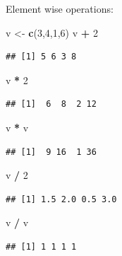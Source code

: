 \documentclass[]{book}
\newenvironment{Shaded}{\begin{snugshade}}{\end{snugshade}}
\newcommand{\DecValTok}[1]{\textcolor[rgb]{0.00,0.00,0.81}{#1}}
\newcommand{\KeywordTok}[1]{\textcolor[rgb]{0.13,0.29,0.53}{\textbf{#1}}}
\newcommand{\NormalTok}[1]{#1}
\newcommand{\OperatorTok}[1]{\textcolor[rgb]{0.81,0.36,0.00}{\textbf{#1}}}
\newcommand{\StringTok}[1]{\textcolor[rgb]{0.31,0.60,0.02}{#1}}
\begin{document}
Element wise operations:

\begin{Shaded}
\begin{Highlighting}[]
\NormalTok{v <-}\StringTok{ }\KeywordTok{c}\NormalTok{(}\DecValTok{3}\NormalTok{,}\DecValTok{4}\NormalTok{,}\DecValTok{1}\NormalTok{,}\DecValTok{6}\NormalTok{)}
\NormalTok{v }\OperatorTok{+}\StringTok{ }\DecValTok{2}
\end{Highlighting}
\end{Shaded}

\begin{verbatim}
## [1] 5 6 3 8
\end{verbatim}

\begin{Shaded}
\begin{Highlighting}[]
\NormalTok{v }\OperatorTok{*}\StringTok{ }\DecValTok{2}
\end{Highlighting}
\end{Shaded}

\begin{verbatim}
## [1]  6  8  2 12
\end{verbatim}

\begin{Shaded}
\begin{Highlighting}[]
\NormalTok{v }\OperatorTok{*}\StringTok{ }\NormalTok{v}
\end{Highlighting}
\end{Shaded}

\begin{verbatim}
## [1]  9 16  1 36
\end{verbatim}

\begin{Shaded}
\begin{Highlighting}[]
\NormalTok{v }\OperatorTok{/}\StringTok{ }\DecValTok{2}
\end{Highlighting}
\end{Shaded}

\begin{verbatim}
## [1] 1.5 2.0 0.5 3.0
\end{verbatim}

\begin{Shaded}
\begin{Highlighting}[]
\NormalTok{v }\OperatorTok{/}\StringTok{ }\NormalTok{v}
\end{Highlighting}
\end{Shaded}

\begin{verbatim}
## [1] 1 1 1 1
\end{verbatim}
\end{document}
